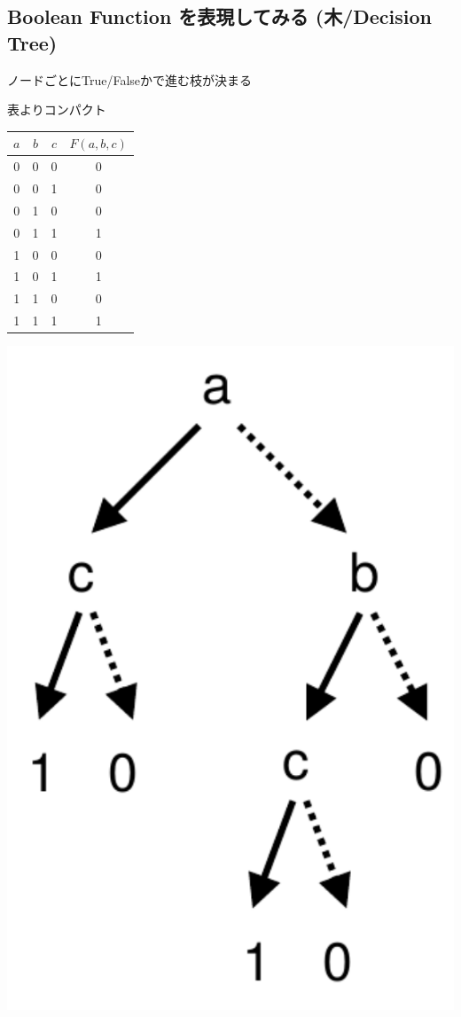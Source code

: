 \subsection{Boolean Function を表現してみる (木/Decision Tree)}
\label{sec-4-3}

ノードごとにTrue/Falseかで進む枝が決まる

表よりコンパクト

\begin{container-fluid}
\begin{row-fluid}
\begin{span8}
\begin{center}
\begin{tabular}{|ccc|c|}
$a$ & $b$ & $c$ & $F(a,b,c)$\\
\hline
0 & 0 & 0 & 0\\
0 & 0 & 1 & 0\\
0 & 1 & 0 & 0\\
0 & 1 & 1 & 1\\
1 & 0 & 0 & 0\\
1 & 0 & 1 & 1\\
1 & 1 & 0 & 0\\
1 & 1 & 1 & 1\\
\end{tabular}
\end{center}
\end{span8}
\begin{span4}
\includegraphics{img/dd-tree.png}

\end{span4}
\end{row-fluid}
\end{container-fluid}
